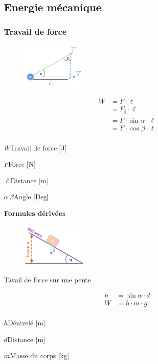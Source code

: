 \documentclass[12pt,a4paper]{article} %
\begin{document}
\subsection{Energie mécanique}

\subsubsection*{Travail de force}
\begin{figure}[h]
	\centering
	\includegraphics[width=0.3\textwidth]{Mecanique-Generalite}
\end{figure}
\begin{twocols}[0.5][0.5]
	\begin{align*}
		W &= F \cdot \ell \\
		  &= F_\parallel \cdot \ell \\
		  &= F \cdot \sin \alpha \cdot \ell \\
		  &= F \cdot \cos \beta \cdot \ell \\
	\end{align*}
\nextcol
	\begin{vardef}
		\item{$W$}{Travail de force [J]}
		\item{$F$}{Force [N]}
		\item{$\ell$}{Distance [m]}
		\item{$\alpha \: \beta$}{Angle [Deg]}
	\end{vardef}
\end{twocols}

\textbf{Formules dérivées}

\begin{figure}[h]
	\centering
	\includegraphics[width=0.3\textwidth]{Mecanique-Travail}
\end{figure}
Tavail de force sur une pente \\
\begin{twocols}[0.5][0.5]
	\begin{align*}
		h &= \sin \alpha \cdot d \\
		W &= h \cdot m \cdot g \\
	\end{align*}
\nextcol
	\begin{vardef}
		\item{$h$}{Dénivelé [m]}
		\item{$d$}{Distance [m]}
		\item{$m$}{Masse du corps [kg]}
	\end{vardef}
\end{twocols}
\end{document}
